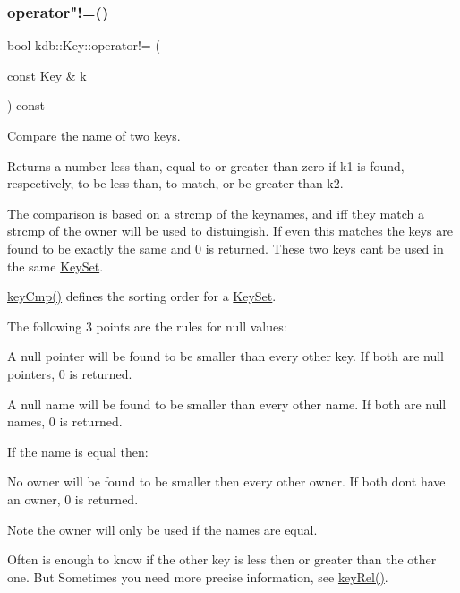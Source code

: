 \subsubsection{\texorpdfstring{operator"!=()}{operator!=()}}
{\footnotesize\ttfamily bool kdb\+::\+Key\+::operator!= (\begin{DoxyParamCaption}\item[{const \hyperlink{classkdb_1_1Key}{Key} \&}]{k }\end{DoxyParamCaption}) const\hspace{0.3cm}{\ttfamily [inline]}}



Compare the name of two keys. 

\begin{DoxyReturn}{Returns}
a number less than, equal to or greater than zero if k1 is found, respectively, to be less than, to match, or be greater than k2.
\end{DoxyReturn}
The comparison is based on a strcmp of the keynames, and iff they match a strcmp of the owner will be used to distuingish. If even this matches the keys are found to be exactly the same and 0 is returned. These two keys can\textquotesingle{}t be used in the same \hyperlink{classkdb_1_1KeySet}{Key\+Set}.

\hyperlink{group__keytest_gaf6e66e12fe04d535a5d1c8218ced803e}{key\+Cmp()} defines the sorting order for a \hyperlink{classkdb_1_1KeySet}{Key\+Set}.

The following 3 points are the rules for null values\+:


\begin{DoxyItemize}
\item A null pointer will be found to be smaller than every other key. If both are null pointers, 0 is returned.
\item A null name will be found to be smaller than every other name. If both are null names, 0 is returned.
\end{DoxyItemize}

If the name is equal then\+:


\begin{DoxyItemize}
\item No owner will be found to be smaller then every other owner. If both don\textquotesingle{}t have an owner, 0 is returned.
\end{DoxyItemize}

\begin{DoxyNote}{Note}
the owner will only be used if the names are equal.
\end{DoxyNote}
Often is enough to know if the other key is less then or greater than the other one. But Sometimes you need more precise information, see \hyperlink{group__keytest_ga6bb0f95ac34ce9c42d61bb35a76139d0}{key\+Rel()}.

